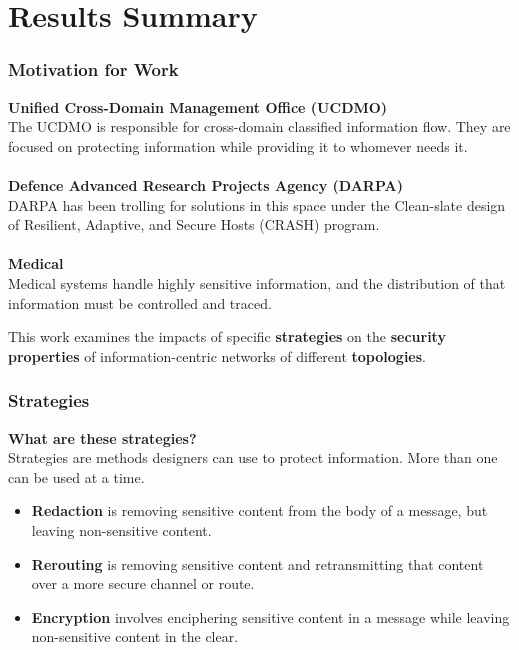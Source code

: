 \documentclass[t,handout]{beamer}
\begin{document}
\section{Results Summary}

\begin{frame}
\frametitle{Motivation for Work}
{\bf Unified Cross-Domain Management Office (UCDMO)} \\
{\small The UCDMO is responsible for cross-domain classified information flow.  They are focused on protecting information while providing it to whomever needs it.} \\
~\\
{\bf Defence Advanced Research Projects Agency (DARPA)} \\
{\small DARPA has been trolling for solutions in this space under the Clean-slate design of Resilient, Adaptive, and Secure Hosts (CRASH) program.} \\
~\\
{\bf Medical} \\
{\small Medical systems handle highly sensitive information, and the distribution of that information must be controlled and traced.} \\
\begin{center}
{\small This work examines the impacts of specific {\bf strategies} on the {\bf security properties} of information-centric networks of different {\bf topologies}.}
\end{center}
\end{frame}

\begin{frame}
\frametitle{Strategies}
{\bf What are these strategies?} \\
{\small Strategies are methods designers can use to protect information.  More than one can be used at a time.} \\
\begin{small}
\begin{itemize}
\item {\bf Redaction} is removing sensitive content from the body of a message, but leaving non-sensitive content.
\item {\bf Rerouting} is removing sensitive content and retransmitting that content over a more secure channel or route.
\item {\bf Encryption} involves enciphering sensitive content in a message while leaving non-sensitive content in the clear.
\end{itemize}
\end{small}
\end{frame}
\end{document}
